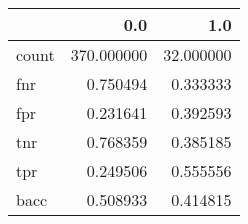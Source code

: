 \begin{tabular}{lrr}
\toprule
{} &         0.0 &        1.0 \\
\midrule
count &  370.000000 &  32.000000 \\
fnr   &    0.750494 &   0.333333 \\
fpr   &    0.231641 &   0.392593 \\
tnr   &    0.768359 &   0.385185 \\
tpr   &    0.249506 &   0.555556 \\
bacc  &    0.508933 &   0.414815 \\
\bottomrule
\end{tabular}
